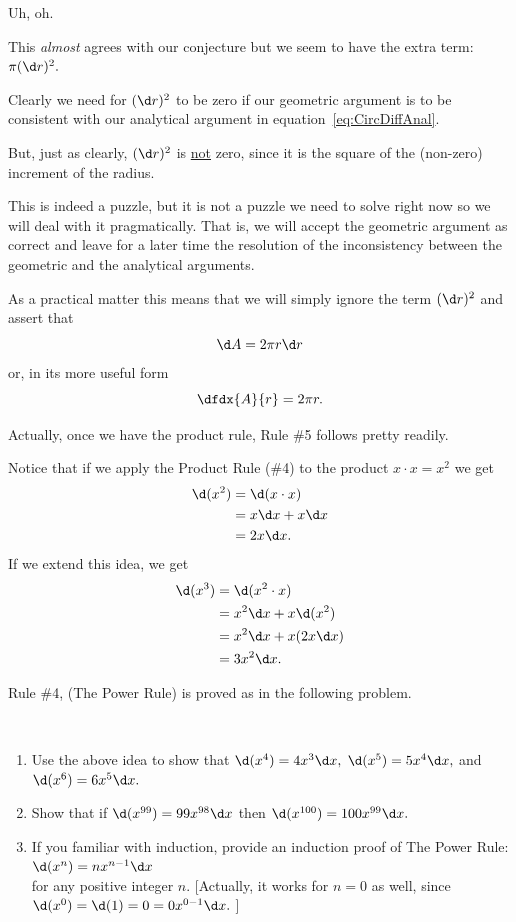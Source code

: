 Uh, oh. 

This \emph{almost} agrees with our conjecture but we seem to have the
extra term: $\pi(\d r)^2.$ 


Clearly we need for $(\d r)^2$ to be zero if our geometric argument is
to be consistent with our analytical argument in
equation~\ref{eq:CircDiffAnal}.

But, just as clearly, $(\d r)^2$ is \underline{not} zero, since it is
the square of the (non-zero) increment of the radius. 


This is indeed a puzzle, but it is not a puzzle we need to solve right
now so we will deal with it pragmatically. That is, we will accept the geometric
argument as correct and leave for a later time the resolution of the
inconsistency between the geometric and the analytical arguments.

As a practical matter this means that we will simply ignore the
term $(\d r)^2$  and assert that 
$$
\d A = 2\pi r\d r
$$
or, in its more useful form
\begin{equation}
\dfdx{A}{r} = 2\pi r.
\label{eq:DiffCirc}
\end{equation}

Actually, once we have the product rule, Rule \#5 follows
pretty readily.

Notice that if we apply the Product Rule (\#4) to the product $x\cdot
x = x^2$ we get
\begin{align*}
  \d (x^2)&=\d (x\cdot x)\\
          &=x\d x+x\d x\\
          &=2x\d x.
\end{align*}
If we extend this idea, we get
\begin{align*}
  \d (x^3)&=\d (x^2\cdot x)\\
          &=x^2\d x+x\d (x^2)\\
          &=x^2\d x+x(2x\d x)\\
          &=3x^2\d x.
\end{align*}

Rule \#4, (The Power Rule) is proved as in the following problem.
\begin{embeddedproblem}{}\ \\
  \begin{enumerate}
  \item Use the above idea to show that $\d (x^4)=4x^3\d x,$   $\d
    (x^5)=5x^4\d x,$ and  $\d (x^6)=6x^5\d x.$
  \item Show that if $\d (x^{99})=99x^{98}\d x$ then $\d
    (x^{100})=100x^{99}\d x.$
  \item If you familiar with induction, provide an induction proof
    of The Power Rule: $\d (x^n)=nx^{n-1}\d x$ \\
    for any positive integer $n.$  [Actually,
    it works for $n=0$ as well, since $\d (x^0)=\d (1)=0=0 x^{0-1}\d x.$ ]
  \end{enumerate}
\end{embeddedproblem}

